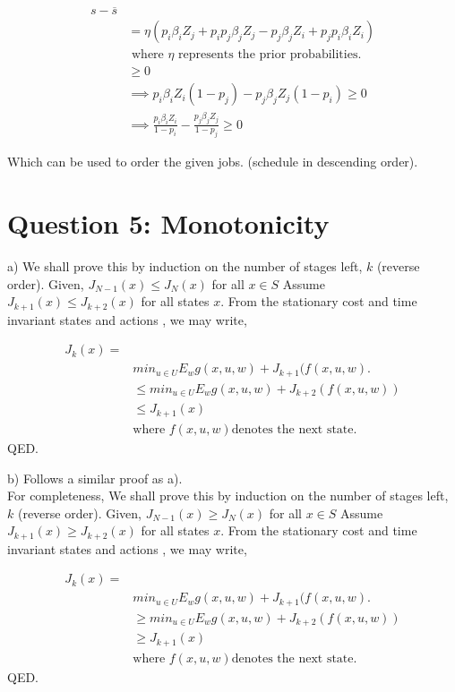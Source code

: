 \documentclass[12pt]{article}
\begin{document}
\begin{align*}
s-\overline{s} \\
& = \eta (p_i\beta_iZ_j + p_ip_j\beta_jZ_j - p_j\beta_jZ_i + p_jp_i\beta_iZ_i) \\
& \text{ where $\eta $ represents the prior probabilities. } \\
& \geqslant 0 \\
& \implies p_i\beta_iZ_i(1-p_j) - p_j\beta_jZ_j(1-p_i) \geqslant 0 \\
& \implies \frac{p_i\beta_iZ_i}{1-p_i} - \frac{p_j\beta_jZ_j}{1-p_j} \geqslant 0 
\end{align*}

Which can be used to order the given jobs. (schedule in descending order).

\section{Question 5: Monotonicity}

a) We shall prove this by induction on the number of stages left, $k$ (reverse order).
Given, $ J_{N−1}(x) ≤ J_N(x)$ for all $x ∈ S$
Assume $J_{k+1}(x) \leqslant J_{k+2}(x) $ for all states $x$.
From the stationary cost and time invariant states and actions , we may write,

\begin{align*}
J_k(x)= \\
& min_{u \in U} E_{w}{g(x,u,w)+J_{k+1}(f(x,u,w)}. \\
& \leqslant min_{u \in U} E_{w}{g(x,u,w)+J_{k+2}(f(x,u,w))} \\
& \leqslant J_{k+1}(x) \\
& \text{where } f(x,u,w) \text{denotes the next state.}
\end{align*}
QED.

b) Follows a similar proof as a).
\\
For completeness,
We shall prove this by induction on the number of stages left, $k$ (reverse order).
Given, $ J_{N−1}(x) \geqslant J_N(x)$ for all $x ∈ S$
Assume $J_{k+1}(x) \geqslant J_{k+2}(x) $ for all states $x$.
From the stationary cost and time invariant states and actions , we may write,

\begin{align*}
J_k(x)= \\
& min_{u \in U} E_{w}{g(x,u,w)+J_{k+1}(f(x,u,w)}. \\
& \geqslant min_{u \in U} E_{w}{g(x,u,w)+J_{k+2}(f(x,u,w))} \\
& \geqslant J_{k+1}(x) \\
& \text{where } f(x,u,w) \text{denotes the next state.}
\end{align*}
QED.
\end{document}
